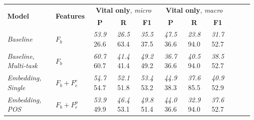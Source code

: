 \documentclass{article}
\newcommand{\sub}[1]{\textit{#1}}
\begin{document}
\begin{table}[tb]
{\small
\begin{center}
\begin{tabular}{llccccccccc} 
\toprule
  \multirow{2}{*}{\textbf{Model}} & 
  \multirow{2}{*}{\textbf{Features}} & 
  \multicolumn{3}{c}{\textbf{Vital only}, \emph{micro}} &
  \multicolumn{3}{c}{\textbf{Vital only}, \emph{macro}}
\\ 
  \cmidrule(lr){3-5}
  \cmidrule(lr){6-8}
&   & 
  \textbf{P} & \textbf{R} & \textbf{F1} & 
  \textbf{P} & \textbf{R} & \textbf{F1} \\ 
\midrule
{\textit{Baseline}} & $F_b$ &
  \sub{53.9}  \hspace{1mm} 26.6 & \sub{26.5} \hspace{1mm} 63.4 & \sub{35.5} \hspace{1mm} 37.5 &
  \sub{47.5}  \hspace{1mm} 36.6 & \sub{23.8} \hspace{1mm} 94.0 & \sub{31.7} \hspace{1mm} 52.7 \\
{\textit{Baseline, Multi-task}} & $F_b$ &
  \sub{60.7} \hspace{1mm} 60.7 & \sub{41.4} \hspace{1mm} 41.4 & \sub{49.2} \hspace{1mm} 49.2 &
  \sub{36.7} \hspace{1mm} 36.6 & \sub{40.5} \hspace{1mm} 94.0 & \sub{38.5} \hspace{1mm} 52.7 \\
{\textit{Embedding, Single}} & $F_b+F_e^c$ & 
  \sub{54.7} \hspace{1mm} 54.7 & \sub{52.1} \hspace{1mm} 51.8 & \sub{53.4} \hspace{1mm} 53.2 &
  \sub{44.9} \hspace{1mm} 38.3 & \sub{37.6} \hspace{1mm} 85.5 & \sub{40.9} \hspace{1mm} 52.9 \\
{\textit{Embedding, POS}} & $F_b+F_e^p$ & 
  \sub{53.9} \hspace{1mm} 49.9 & \sub{46.4} \hspace{1mm} 53.1 & \sub{49.8} \hspace{1mm} 51.4 &
  \sub{44.0} \hspace{1mm} 36.6 & \sub{32.9} \hspace{1mm} 94.0 & \sub{37.6} \hspace{1mm} 52.7 \\

\end{tabular}
\end{center}}
\end{table}
\end{document}
